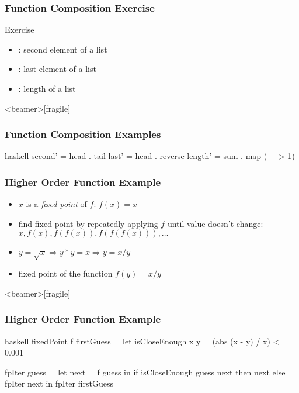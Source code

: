 \documentclass[dvipsnames]{beamer}
\theoremstyle{plain}
\begin{document}
\begin{frame}[fragile]
  \frametitle{Function Composition Exercise}

  \begin{block}{Exercise}
    \begin{itemize}
      \item {}: second element of a list
      \item {}: last element of a list
      \item {}: length of a list
    \end{itemize}
  \end{block}
\end{frame}

\begin{frame}<beamer>[fragile]
  \frametitle{Function Composition Examples}

  \begin{example}[Haskell]
    \begin{pygments}{haskell}
second' = head . tail
last' = head . reverse
length' = sum . map (\_ -> 1)
    \end{pygments}
  \end{example}
\end{frame}

\begin{frame}[fragile]
  \frametitle{Higher Order Function Example}

  \begin{example}
    \begin{itemize}
      \item $x$ is a \emph{fixed point} of $f$: $f(x)=x$
      \item find fixed point by repeatedly applying $f$ until value doesn't change:\\
        $x,f(x),f(f(x)),f(f(f(x))),\ldots$

      \medskip
      \item $y = \sqrt{x} \Rightarrow y * y = x \Rightarrow y = x / y$
      \item fixed point of the function $f(y) = x / y$
    \end{itemize}
  \end{example}
\end{frame}

\begin{frame}<beamer>[fragile]
  \frametitle{Higher Order Function Example}

  \begin{example}
    \begin{pygments}{haskell}
fixedPoint f firstGuess =
    let
        isCloseEnough x y = (abs (x - y) / x) < 0.001

        fpIter guess =
            let
                next = f guess
            in
                if isCloseEnough guess next
                then next
                else fpIter next
    in
        fpIter firstGuess
    \end{pygments}
  \end{example}
\end{frame}
\end{document}
